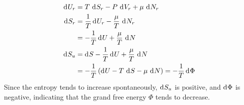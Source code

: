 \documentclass{article}
\begin{document}
\begin{equation}
    \begin{split}
        \diff{U}_r & = T \, \diff{S}_r - P \, \diff{V}_r + \mu \, \diff{N}_r  \\
        \diff{S}_r & = \frac{1}{T}\diff{U}_r - \frac{\mu}{T} \, \diff{N}_r \\
        & = -\frac{1}{T}\diff{U} + \frac{\mu}{T} \, \diff{N} \\
        \diff{S}_u & = \diff{S} -\frac{1}{T}\diff{U} + \frac{\mu}{T} \, \diff{N} \\
        & = -\frac{1}{T}\left(\diff{U} - T \, \diff{S} - \mu \, \diff{N}\right) = -\frac{1}{T}\diff{\Phi}
    \end{split}
\end{equation}
Since the entropy tends to increase spontaneously, $\diff{S}_u$ is positive, and $\diff{\Phi}$ is negative, indicating that the grand free energy $\Phi$ tends to decrease.

\clearpage
\end{document}
